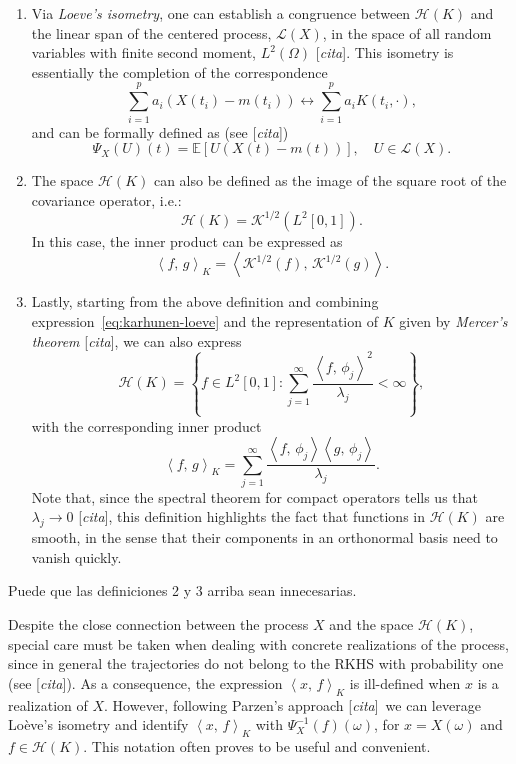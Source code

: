 \documentclass[ba]{imsart}
\numberwithin{equation}{section}
\theoremstyle{plain}
\newcommand{\E}{\mathbb{E}}
\newcommand\dotprod[2]{\left\langle #1,\, #2 \right\rangle}
\newenvironment{comment}
{
\noindent \em \color{red}
}
{
\color{black}
}
\newcommand\incomment[1]{\color{red}[\textit{#1}]\color{black}}
\begin{document}
\begin{enumerate}
  \item Via \textit{Loeve's isometry}, one can establish a congruence between \(\mathcal H(K)\) and the linear span of the centered process, \(\mathcal L(X)\), in the space of all random variables with finite second moment, \(L^2(\Omega)\) \incomment{cita}. This isometry is essentially the completion of the correspondence
  \[
  \sum_{i=1}^p a_i (X(t_i) - m(t_i)) \longleftrightarrow \sum_{i=1}^p a_i K(t_i, \cdot),
\]
and can be formally defined as (see \incomment{cita})
\begin{equation}\label{eq:loeves-isometry}
  \Psi_X(U)(t) = \E[U(X(t) - m(t))], \quad U \in \mathcal L(X).
\end{equation}
  \item The space \(\mathcal H(K)\) can also be defined as the image of the square root of the covariance operator, i.e.:
  \begin{equation}\label{eq:rkhs-square-root}
  \mathcal H(K) = \mathcal K^{1/2}(L^2[0, 1]).
\end{equation}
In this case, the inner product can be expressed as
\[
\dotprod{f}{g}_K = \dotprod{\mathcal K^{1/2}(f)}{\mathcal K^{1/2}(g)}.
\]

  \item Lastly, starting from the above definition and combining expression~\eqref{eq:karhunen-loeve} and the representation of \(K\) given by \textit{Mercer's theorem} \incomment{cita}, we can also express
  \begin{equation}\label{rkhs-sum-lambda}
    \mathcal H(K) = \left\{f \in L^2[0, 1]: \sum_{j=1}^\infty \frac{\dotprod{f}{\phi_j}^2}{\lambda_j} < \infty \right\},
  \end{equation}
  with the corresponding inner product
  \[
  \dotprod{f}{g}_K = \sum_{j=1}^\infty \frac{\dotprod{f}
  {\phi_j}\dotprod{g}{\phi_j}}{\lambda_j}.
  \]
Note that, since the spectral theorem for compact operators tells us that \(\lambda_j \to 0\) \incomment{cita}, this definition highlights the fact that functions in \(\mathcal H(K)\) are smooth, in the sense that their components in an orthonormal basis need to vanish quickly.
\end{enumerate}

\begin{comment}
  Puede que las definiciones 2 y 3 arriba sean innecesarias.
\end{comment}

Despite the close connection between the process \(X\) and the space \(\mathcal H(K)\), special care must be taken when dealing with concrete realizations of the process, since in general the trajectories do not belong to the RKHS with probability one (see \incomment{cita}). As a consequence, the expression \(\dotprod{x}{f}_K\) is ill-defined when \(x\) is a realization of \(X\). However, following Parzen's approach \incomment{cita}\ we can leverage Loève's isometry and identify \(\dotprod{x}{f}_K \) with \( \Psi_X^{-1}(f)(\omega)\), for \(x=X(\omega)\) and \(f\in \mathcal H(K)\). This notation often proves to be useful and convenient.
\end{document}
